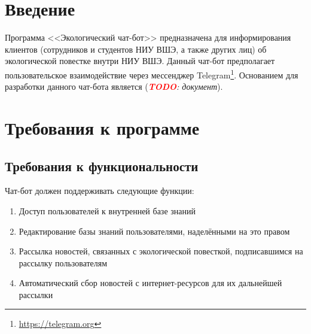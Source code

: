 \documentclass[12pt]{article}
\title{\myTitle}
\author{}
\newcommand{\sectionBreaksTerse}{\vspace{1cm}}
\newcommand{\sectionBreaks}{\sectionBreaksTerse}
\let\origSection\section
\renewcommand{\section}{\sectionBreaks\origSection}
\newcommand{\inlinetodo}[1]{(\emph{\textcolor{red}{\textbf{TODO}}: #1})}
\begin{document}

\newpage

\tableofcontents
\newpage

\section{Введение}
    \label{sec:intro}
    Программа <<Экологический чат-бот>> предназначена для информирования клиентов (сотрудников и студентов
    НИУ ВШЭ, а также других лиц) об экологической повестке внутри НИУ ВШЭ. Данный чат-бот предполагает
    пользовательское взаимодействие через мессенджер Telegram\footnote{\url{https://telegram.org}}.
    Основанием для разработки данного чат-бота является \inlinetodo{документ}.

\section{Требования к программе}
    \label{sec:req}
    \subsection{Требования к функциональности}
        \label{sec:req:fn}
        Чат-бот должен поддерживать следующие функции:
        \begin{enumerate}
            \item
                Доступ пользователей к внутренней базе знаний
            \item
                Редактирование базы знаний пользователями, наделёнными на это правом
            \item
                Рассылка новостей, связанных с экологической повесткой, подписавшимся на рассылку
                пользователям
            \item
                Автоматический сбор новостей с интернет-ресурсов для их дальнейшей рассылки
        \end{enumerate}
\end{document}
